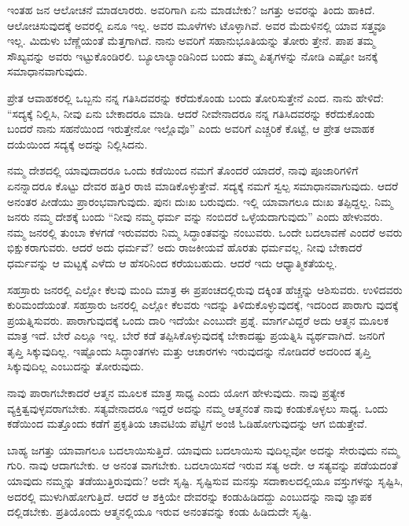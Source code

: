 ಇಂತಹ ಜನ ಆಲೋಚನೆ ಮಾಡಲಾರರು. ಅವರಿಗಾಗಿ ಏನು ಮಾಡಬೇಕು? ಜಗತ್ತು ಅವರನ್ನು ತಿಂದು ಹಾಕಿದೆ. ಆಲೋಚಿಸುವುದಕ್ಕೆ ಅವರಲ್ಲಿ ಏನೂ ಇಲ್ಲ. ಅವರ ಮೂಳೆಗಳು ಟೊಳ್ಳಾಗಿವೆ. ಅವರ ಮೆದುಳಿನಲ್ಲಿ ಯಾವ ಸತ್ತ್ವವೂ ಇಲ್ಲ. ಮಿದುಳು ಬೆಣ್ಣೆಯಂತೆ ಮೆತ್ತಗಾಗಿದೆ. ನಾನು ಅವರಿಗೆ ಸಹಾನುಭೂತಿಯನ್ನು ತೋರು ತ್ತೇನೆ. ಪಾಪ ತಮ್ಮ ಸೌಖ್ಯವನ್ನು ಅವರು ಇಟ್ಟುಕೊಂಡಿರಲಿ. ಬ್ಯೂಲಾಲ್ಯಾಂಡಿನಿಂದ ಬಂದು ತಮ್ಮ ಪಿತೃಗಳನ್ನು ನೋಡಿ ಎಷ್ಟೋ ಜನಕ್ಕೆ ಸಮಾಧಾನವಾಗುವುದು.

ಪ್ರೇತ ಆವಾಹಕರಲ್ಲಿ ಒಬ್ಬನು ನನ್ನ ಗತಿಸಿದವರನ್ನು ಕರೆದುಕೊಂಡು ಬಂದು ತೋರಿಸುತ್ತೇನೆ ಎಂದ. ನಾನು ಹೇಳಿದೆ: “ಸದ್ಯಕ್ಕೆ ನಿಲ್ಲಿಸಿ, ನೀವು ಏನು ಬೇಕಾದರೂ ಮಾಡಿ. ಆದರೆ ನೀವೇನಾದರೂ ನನ್ನ ಗತಿಸಿದವರನ್ನು ಕರೆದುಕೊಂಡು ಬಂದರೆ ನಾನು ಸಹನೆಯಿಂದ ಇರುತ್ತೇನೋ ಇಲ್ಲೊವೊ” ಎಂದು ಅವರಿಗೆ ಎಚ್ಚರಿಕೆ ಕೊಟ್ಟೆ, ಆ ಪ್ರೇತ ಆವಾಹಕ ದಯೆಯಿಂದ ಸದ್ಯಕ್ಕೆ ಅದನ್ನು ನಿಲ್ಲಿಸಿದನು.

ನಮ್ಮ ದೇಶದಲ್ಲಿ ಯಾವುದಾದರೂ ಒಂದು ಕಡೆಯಿಂದ ನಮಗೆ ತೊಂದರೆ ಯಾದರೆ, ನಾವು ಪೂಜಾರಿಗಳಿಗೆ ಏನನ್ನಾದರೂ ಕೊಟ್ಟು ದೇವರ ಹತ್ತಿರ ರಾಜಿ ಮಾಡಿಕೊಳ್ಳುತ್ತೇವೆ. ಸದ್ಯಕ್ಕೆ ನಮಗೆ ಸ್ವಲ್ಪ ಸಮಾಧಾನವಾಗುವುದು. ಆದರೆ ಅನಂತರ ಪೀಡೆಯು ಪ್ರಾರಂಭವಾಗುವುದು. ಪುನಃ ದುಃಖ ಬರುವುದು. ಇಲ್ಲಿ ಯಾವಾಗಲೂ ದುಃಖ ತಪ್ಪಿದ್ದಲ್ಲ. ನಿಮ್ಮ ಜನರು ನಮ್ಮ ದೇಶಕ್ಕೆ ಬಂದು “ನೀವು ನಮ್ಮ ಧರ್ಮ ವನ್ನು ನಂಬಿದರೆ ಒಳ್ಳೆಯದಾಗುವುದು” ಎಂದು ಹೇಳುವರು. ನಮ್ಮ ಜನರಲ್ಲಿ ತುಂಬಾ ಕೆಳಗಡೆ ಇರುವವರು ನಿಮ್ಮ ಸಿದ್ಧಾಂತವನ್ನು ನಂಬುವರು. ಒಂದೇ ಬದಲಾವಣೆ ಎಂದರೆ ಅವರು ಭಿಕ್ಷುಕರಾಗುವರು. ಆದರೆ ಅದು ಧರ್ಮವೆ? ಅದು ರಾಜಕೀಯವೆ ಹೊರತು ಧರ್ಮವಲ್ಲ. ನೀವು ಬೇಕಾದರೆ ಧರ್ಮವನ್ನು ಆ ಮಟ್ಟಕ್ಕೆ ಎಳೆದು ಆ ಹೆಸರಿನಿಂದ ಕರೆಯಬಹುದು. ಆದರೆ ಇದು ಆಧ್ಯಾತ್ಮಿಕತೆಯಲ್ಲ.

ಸಹಸ್ರಾರು ಜನರಲ್ಲಿ ಎಲ್ಲೋ ಕೆಲವು ಮಂದಿ ಮಾತ್ರ ಈ ಪ್ರಪಂಚದಲ್ಲಿರುವು ದಕ್ಕಿಂತ ಹೆಚ್ಚನ್ನು ಆಶಿಸುವರು. ಉಳಿದವರು ಕುರಿಮಂದೆಯಂತೆ. ಸಹಸ್ರಾರು ಜನರಲ್ಲಿ ಎಲ್ಲೋ ಕೆಲವರು ಇದನ್ನು ತಿಳಿದುಕೊಳ್ಳುವುದಕ್ಕೆ, ಇದರಿಂದ ಪಾರಾಗು ವುದಕ್ಕೆ ಪ್ರಯತ್ನಿಸುವರು. ಪಾರಾಗುವುದಕ್ಕೆ ಒಂದು ದಾರಿ ಇದೆಯೇ ಎಂಬುದೇ ಪ್ರಶ್ನೆ. ಮಾರ್ಗವಿದ್ದರೆ ಅದು ಆತ್ಮನ ಮೂಲಕ ಮಾತ್ರ ಇದೆ. ಬೇರೆ ಎಲ್ಲೂ ಇಲ್ಲ. ಬೇರೆ ಕಡೆ ತಪ್ಪಿಸಿಕೊಳ್ಳುವುದಕ್ಕೆ ಬೇಕಾದಷ್ಟು ಪ್ರಯತ್ನಿಸಿ ವ್ಯರ್ಥವಾಗಿದೆ. ಜನರಿಗೆ ತೃಪ್ತಿ ಸಿಕ್ಕುವುದಿಲ್ಲ. ಇಷ್ಟೊಂದು ಸಿದ್ಧಾಂತಗಳು ಮತ್ತು ಆಚಾರಗಳು ಇರುವುದನ್ನು ನೋಡಿದರೆ ಅದರಿಂದ ತೃಪ್ತಿ ಸಿಕ್ಕುವುದಿಲ್ಲ ಎಂಬುದನ್ನು ತೋರುವುದು.

ನಾವು ಪಾರಾಗಬೇಕಾದರೆ ಆತ್ಮನ ಮೂಲಕ ಮಾತ್ರ ಸಾಧ್ಯ ಎಂದು ಯೋಗ ಹೇಳುವುದು. ನಾವು ಪ್ರತ್ಯೇಕ ವ್ಯಕ್ತಿತ್ವವುಳ್ಳವರಾಗಬೇಕು. ಸತ್ಯವೇನಾದರೂ ಇದ್ದರೆ ಅದನ್ನು ನಮ್ಮ ಆತ್ಮನಂತೆ ನಾವು ಕಂಡುಕೊಳ್ಳಲು ಸಾಧ್ಯ. ಒಂದು ಕಡೆಯಿಂದ ಮತ್ತೊಂದು ಕಡೆಗೆ ಪ್ರಕೃತಿಯ ಚಾವಟಿಯ ಪೆಟ್ಟಿಗೆ ಅಂಜಿ ಓಡಿಹೋಗುವುದನ್ನು ಆಗ ಬಿಡುತ್ತೇವೆ.

ಬಾಹ್ಯ ಜಗತ್ತು ಯಾವಾಗಲೂ ಬದಲಾಯಿಸುತ್ತಿದೆ. ಯಾವುದು ಬದಲಾಯಿಸು ವುದಿಲ್ಲವೋ ಅದನ್ನು ಸೇರುವುದು ನಮ್ಮ ಗುರಿ. ನಾವು ಆದಾಗಬೇಕು. ಆ ಅನಂತ ವಾಗಬೇಕು. ಬದಲಾಯಿಸದೆ ಇರುವ ಸತ್ಯ ಅದೇ. ಆ ಸತ್ಯವನ್ನು ಪಡೆಯದಂತೆ ಯಾವುದು ನಮ್ಮನ್ನು ತಡೆಯುತ್ತಿರುವುದು? ಅದೇ ಸೃಷ್ಟಿ. ಸೃಷ್ಟಿಸುವ ಮನಸ್ಸು ಸದಾಕಾಲದಲ್ಲಿಯೂ ವಸ್ತುಗಳನ್ನು ಸೃಷ್ಟಿಸಿ, ಅದರಲ್ಲಿ ಮುಳುಗಿಹೋಗುತ್ತಿದೆ. ಆದರೆ ಆ ಶಕ್ತಿಯೇ ದೇವರನ್ನು ಕಂಡುಹಿಡಿದದ್ದು ಎಂಬುದನ್ನು ನಾವು ಜ್ಞಾಪಕ ದಲ್ಲಿಡಬೇಕು. ಪ್ರತಿಯೊಂದು ಆತ್ಮನಲ್ಲಿಯೂ ಇರುವ ಅನಂತವನ್ನು ಕಂಡು ಹಿಡಿದುದೇ ಸೃಷ್ಟಿ.

